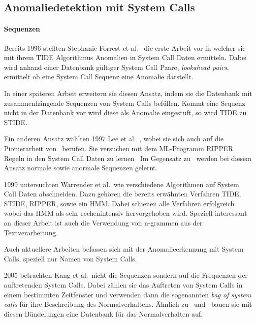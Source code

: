     \subsection{Anomaliedetektion mit System Calls}

    \paragraph{Sequenzen}
        Bereits 1996 stellten Stephanie Forrest et al.~\cite{FORREST} die erste Arbeit vor in welcher sie mit ihrem \ac{TIDE} Algorithmus Anomalien in System Call Daten ermitteln.
        Dabei wird anhand einer Datenbank gültiger System Call Paare, \textit{lookahead pairs}, ermittelt ob eine System Call Sequenz eine Anomalie darstellt.

        In einer späteren Arbeit erweitern sie diesen Ansatz, indem sie die Datenbank mit zusammenhängende Sequenzen von System Calls befüllen.
        Kommt eine Sequenz nicht in der Datenbank vor wird diese als Anomalie eingestuft, so wird \ac{TIDE} zu \ac{STIDE}.~\cite{STIDE}

        Ein anderen Ansatz wählten 1997 Lee et al.~\cite{LEE1997}, wobei sie sich auch auf die Pionierarbeit von~\cite{FORREST} berufen.
        Sie versuchen mit dem \ac{ML}-Programm \ac{RIPPER} Regeln in den System Call Daten zu lernen~\cite{LEE1997}
        Im Gegensatz zu~\cite{FORREST} werden bei diesem Ansatz normale sowie anormale Sequenzen gelernt.

        1999 untersuchten Warrender et al.\ wie verschiedene Algorithmen auf System Call Daten abschneiden.
        Dazu gehören die bereits erwähnten Verfahren \ac{TIDE}, \ac{STIDE}, \ac{RIPPER}, sowie ein \ac{HMM}.
        Dabei schienen alle Verfahren erfolgreich wobei das \ac{HMM} als sehr rechenintensiv hervorgehoben wird.
        Speziell interessant an dieser Arbeit ist auch die Verwendung von n-grammen aus der Textverarbeitung.~\cite{STIDE_Alternatives}
 
        Auch aktuellere Arbeiten befassen sich mit der Anomalieerkennung mit System Calls, {\color{red} speziell nur Namen von System Calls}.
    
        2005 betrachten Kang et al.\ nicht die Sequenzen sondern auf die Frequenzen der auftretenden System Calls.
        Dabei zählen sie das Auftreten von System Calls in einem bestimmten Zeitfenster und verwenden dann die sogenannten \textit{bag of system calls} für ihre Beschreibung des Normalverhaltens.
        Ähnlich zu~\cite{FORREST} und~\cite{STIDE} bauen sie mit diesen Bündelungen eine Datenbank für das Normalverhalten auf.~\cite{FREQUENCY2}

